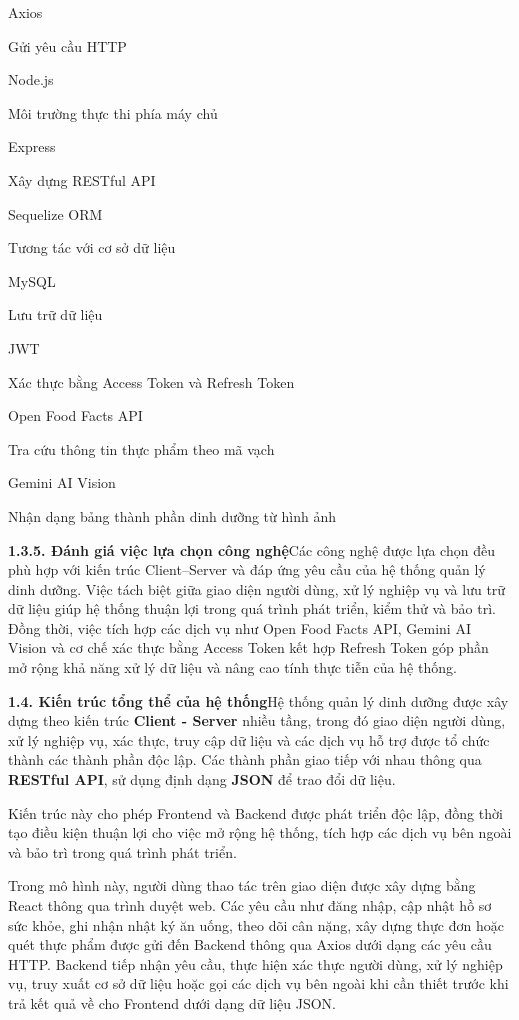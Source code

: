 Axios

Gửi yêu cầu HTTP

Node.js

Môi trường thực thi phía máy chủ

Express

Xây dựng RESTful API

Sequelize ORM

Tương tác với cơ sở dữ liệu

MySQL

Lưu trữ dữ liệu

JWT

Xác thực bằng Access Token và Refresh Token

Open Food Facts API

Tra cứu thông tin thực phẩm theo mã vạch

Gemini AI Vision

Nhận dạng bảng thành phần dinh dưỡng từ hình ảnh

\textbf{1.3.5. Đánh giá việc lựa chọn công nghệ}Các công nghệ được lựa chọn đều phù hợp với kiến trúc Client–Server và đáp ứng yêu cầu của hệ thống quản lý dinh dưỡng. Việc tách biệt giữa giao diện người dùng, xử lý nghiệp vụ và lưu trữ dữ liệu giúp hệ thống thuận lợi trong quá trình phát triển, kiểm thử và bảo trì. Đồng thời, việc tích hợp các dịch vụ như Open Food Facts API, Gemini AI Vision và cơ chế xác thực bằng Access Token kết hợp Refresh Token góp phần mở rộng khả năng xử lý dữ liệu và nâng cao tính thực tiễn của hệ thống.

\textbf{1.4. Kiến trúc tổng thể của hệ thống}Hệ thống quản lý dinh dưỡng được xây dựng theo kiến trúc \textbf{Client - Server} nhiều tầng, trong đó giao diện người dùng, xử lý nghiệp vụ, xác thực, truy cập dữ liệu và các dịch vụ hỗ trợ được tổ chức thành các thành phần độc lập. Các thành phần giao tiếp với nhau thông qua \textbf{RESTful API}, sử dụng định dạng \textbf{JSON} để trao đổi dữ liệu.

Kiến trúc này cho phép Frontend và Backend được phát triển độc lập, đồng thời tạo điều kiện thuận lợi cho việc mở rộng hệ thống, tích hợp các dịch vụ bên ngoài và bảo trì trong quá trình phát triển.

Trong mô hình này, người dùng thao tác trên giao diện được xây dựng bằng React thông qua trình duyệt web. Các yêu cầu như đăng nhập, cập nhật hồ sơ sức khỏe, ghi nhận nhật ký ăn uống, theo dõi cân nặng, xây dựng thực đơn hoặc quét thực phẩm được gửi đến Backend thông qua Axios dưới dạng các yêu cầu HTTP. Backend tiếp nhận yêu cầu, thực hiện xác thực người dùng, xử lý nghiệp vụ, truy xuất cơ sở dữ liệu hoặc gọi các dịch vụ bên ngoài khi cần thiết trước khi trả kết quả về cho Frontend dưới dạng dữ liệu JSON.

